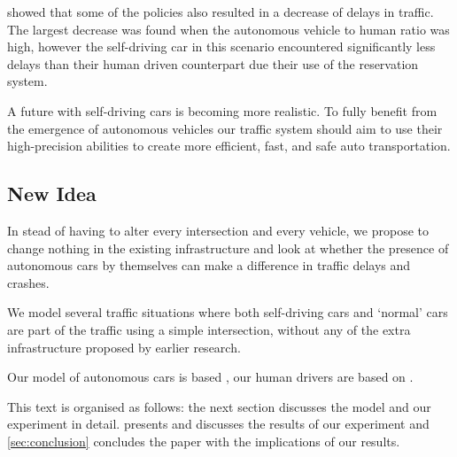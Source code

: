\textcite{dresner2007sharing} showed that some of the policies also resulted in a decrease of delays in traffic. The largest decrease was found when the autonomous vehicle to human ratio was high, however the self-driving car in this scenario encountered significantly less delays than their human driven counterpart due their use of the reservation system.

A future with self-driving cars is becoming more realistic. To fully benefit from the emergence of autonomous vehicles our traffic system should aim to use their high-precision abilities to create more efficient, fast, and safe auto transportation.


\subsection{New Idea}
\label{sub:intro:new_idea}	
In stead of having to alter every intersection and every vehicle, we propose to change nothing in the existing infrastructure and look at whether the presence of autonomous cars by themselves can make a difference in traffic delays and crashes. 

We model several traffic situations where both self-driving cars and `normal' cars are part of the traffic using a simple intersection, without any of the extra infrastructure proposed by earlier research. 


Our model of autonomous cars is based \textcite{jiang2010microscopic}, our human drivers are based on \textcite{paruchuri2002multi}.

This text is organised as follows: the next section discusses the model and our experiment in detail.  presents and discusses the results of our experiment and \cref{sec:conclusion} concludes the paper with the implications of our results.